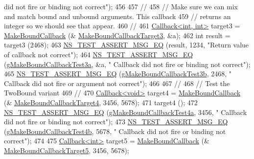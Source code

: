 \begin{DoxyCode}
{       did not fire or binding not correct"});
456 
457   \textcolor{comment}{//}
458   \textcolor{comment}{// Make sure we can mix and match bound and unbound arguments.  This callback}
459   \textcolor{comment}{// returns an integer so we should see that appear.}
460   \textcolor{comment}{//}
461   \hyperlink{classns3_1_1Callback}{Callback<int, int>} target3 = \hyperlink{group__makeboundcallback_ga1725d6362e6065faa0709f7c93f8d770}{MakeBoundCallback} (&
      \hyperlink{callback-test-suite_8cc_a8748da9abbffd91eee6535b35fd616c9}{MakeBoundCallbackTarget3}, &a);
462   \textcolor{keywordtype}{int} result = target3 (2468);
463   \hyperlink{group__testing_ga2a9d78cffb3db8e867c35fff0b698cf5}{NS\_TEST\_ASSERT\_MSG\_EQ} (result, 1234, \textcolor{stringliteral}{"Return value of callback not correct"});
464   \hyperlink{group__testing_ga2a9d78cffb3db8e867c35fff0b698cf5}{NS\_TEST\_ASSERT\_MSG\_EQ} (\hyperlink{callback-test-suite_8cc_a4823c46db6aa3f6dc6f22d469530282b}{gMakeBoundCallbackTest3a}, &a, \textcolor{stringliteral}{"
      Callback did not fire or binding not correct"});
465   \hyperlink{group__testing_ga2a9d78cffb3db8e867c35fff0b698cf5}{NS\_TEST\_ASSERT\_MSG\_EQ} (\hyperlink{callback-test-suite_8cc_a89a5cbdc689d0e2873c1bdd0a02b911c}{gMakeBoundCallbackTest3b}, 2468, \textcolor{stringliteral}{"
      Callback did not fire or argument not correct"});
466 
467   \textcolor{comment}{//}
468   \textcolor{comment}{// Test the TwoBound variant}
469   \textcolor{comment}{//}
470   \hyperlink{classns3_1_1Callback}{Callback<void>} target4 = \hyperlink{group__makeboundcallback_ga1725d6362e6065faa0709f7c93f8d770}{MakeBoundCallback} (&
      \hyperlink{callback-test-suite_8cc_a87609ce803be4cfed07341253cfbe729}{MakeBoundCallbackTarget4}, 3456, 5678);
471   target4 ();
472   \hyperlink{group__testing_ga2a9d78cffb3db8e867c35fff0b698cf5}{NS\_TEST\_ASSERT\_MSG\_EQ} (\hyperlink{callback-test-suite_8cc_adcdcedb8a5a0b5b8510241d9234bc437}{gMakeBoundCallbackTest4a}, 3456, \textcolor{stringliteral}{"
      Callback did not fire or binding not correct"});
473   \hyperlink{group__testing_ga2a9d78cffb3db8e867c35fff0b698cf5}{NS\_TEST\_ASSERT\_MSG\_EQ} (\hyperlink{callback-test-suite_8cc_a6356e7aca7e7548fa5e66937402bc97b}{gMakeBoundCallbackTest4b}, 5678, \textcolor{stringliteral}{"
      Callback did not fire or binding not correct"});
474 
475   \hyperlink{classns3_1_1Callback}{Callback<int>} target5 = \hyperlink{group__makeboundcallback_ga1725d6362e6065faa0709f7c93f8d770}{MakeBoundCallback} (&
      \hyperlink{callback-test-suite_8cc_a1a26b4dbf16e2882ca73896878a6e743}{MakeBoundCallbackTarget5}, 3456, 5678);

\end{DoxyCode}
